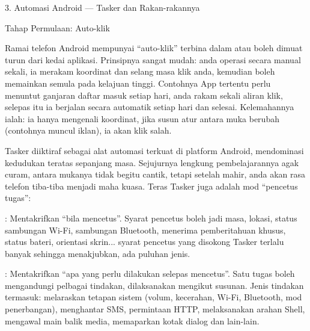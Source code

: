 
3. Automasi Android — Tasker dan Rakan-rakannya


Tahap Permulaan: Auto-klik

Ramai telefon Android mempunyai “auto-klik” terbina dalam atau boleh dimuat turun dari kedai aplikasi. Prinsipnya sangat mudah: anda operasi secara manual sekali, ia merakam koordinat dan selang masa klik anda, kemudian boleh memainkan semula pada kelajuan tinggi. Contohnya App tertentu perlu menuntut ganjaran daftar masuk setiap hari, anda rakam sekali aliran klik, selepas itu ia berjalan secara automatik setiap hari dan selesai. Kelemahannya ialah: ia hanya mengenali koordinat, jika susun atur antara muka berubah (contohnya muncul iklan), ia akan klik salah.


Tasker diiktiraf sebagai alat automasi terkuat di platform Android, mendominasi kedudukan teratas sepanjang masa. Sejujurnya lengkung pembelajarannya agak curam, antara mukanya tidak begitu cantik, tetapi setelah mahir, anda akan rasa telefon tiba-tiba menjadi maha kuasa. Teras Tasker juga adalah mod “pencetus tugas”:


: Mentakrifkan “bila mencetus”. Syarat pencetus boleh jadi masa, lokasi, status sambungan Wi-Fi, sambungan Bluetooth, menerima pemberitahuan khusus, status bateri, orientasi skrin... syarat pencetus yang disokong Tasker terlalu banyak sehingga menakjubkan, ada puluhan jenis.


: Mentakrifkan “apa yang perlu dilakukan selepas mencetus”. Satu tugas boleh mengandungi pelbagai tindakan, dilaksanakan mengikut susunan. Jenis tindakan termasuk: melaraskan tetapan sistem (volum, kecerahan, Wi-Fi, Bluetooth, mod penerbangan), menghantar SMS, permintaan HTTP, melaksanakan arahan Shell, mengawal main balik media, memaparkan kotak dialog dan lain-lain.

